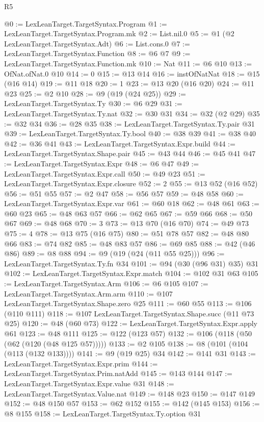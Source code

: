 \begin{lexlean}{R5}
\begin{coremodule}
@0 := LexLeanTarget.TargetSyntax.Program
@1 := LexLeanTarget.TargetSyntax.Program.mk
@2 := List.nil.{0}
@5 := @1 (@2 LexLeanTarget.TargetSyntax.Adt)
@6 := List.cons.{0}
@7 := LexLeanTarget.TargetSyntax.Function
@8 := @6 @7
@9 := LexLeanTarget.TargetSyntax.Function.mk
@10 := Nat
@11 := @6 @10
@13 := OfNat.ofNat.{0} @10
@14 := 0
@15 := @13 @14
@16 := instOfNatNat
@18 := @15 (@16 @14)
@19 := @11 @18
@20 := 1
@23 := @13 @20 (@16 @20)
@24 := @11 @23
@25 := @2 @10
@28 := @9 (@19 (@24 @25))
@29 := LexLeanTarget.TargetSyntax.Ty
@30 := @6 @29
@31 := LexLeanTarget.TargetSyntax.Ty.nat
@32 := @30 @31
@34 := @32 (@2 @29)
@35 := @32 @34
@36 := @28 @35
@38 := LexLeanTarget.TargetSyntax.Ty.pair @31
@39 := LexLeanTarget.TargetSyntax.Ty.bool
@40 := @38 @39
@41 := @38 @40
@42 := @36 @41
@43 := LexLeanTarget.TargetSyntax.Expr.build
@44 := LexLeanTarget.TargetSyntax.Shape.pair
@45 := @43 @44
@46 := @45 @41
@47 := LexLeanTarget.TargetSyntax.Expr
@48 := @6 @47
@49 := LexLeanTarget.TargetSyntax.Expr.call
@50 := @49 @23
@51 := LexLeanTarget.TargetSyntax.Expr.closure
@52 := 2
@55 := @13 @52 (@16 @52)
@56 := @51 @55
@57 := @2 @47
@58 := @56 @57
@59 := @48 @58
@60 := LexLeanTarget.TargetSyntax.Expr.var
@61 := @60 @18
@62 := @48 @61
@63 := @60 @23
@65 := @48 @63 @57
@66 := @62 @65
@67 := @59 @66
@68 := @50 @67
@69 := @48 @68
@70 := 3
@73 := @13 @70 (@16 @70)
@74 := @49 @73
@75 := 4
@78 := @13 @75 (@16 @75)
@80 := @51 @78 @57
@82 := @48 @80 @66
@83 := @74 @82
@85 := @48 @83 @57
@86 := @69 @85
@88 := @42 (@46 @86)
@89 := @8 @88
@94 := @9 (@19 (@24 (@11 @55 @25)))
@96 := LexLeanTarget.TargetSyntax.Ty.fn @34
@101 := @94 (@30 (@96 @31) @35) @31
@102 := LexLeanTarget.TargetSyntax.Expr.match
@104 := @102 @31 @63
@105 := LexLeanTarget.TargetSyntax.Arm
@106 := @6 @105
@107 := LexLeanTarget.TargetSyntax.Arm.arm
@110 := @107 LexLeanTarget.TargetSyntax.Shape.zero @25
@111 := @60 @55
@113 := @106 (@110 @111)
@118 := @107 LexLeanTarget.TargetSyntax.Shape.succ (@11 @73 @25)
@120 := @48 (@60 @73)
@122 := LexLeanTarget.TargetSyntax.Expr.apply @61
@123 := @48 @111
@125 := @122 (@123 @57)
@132 := @106 (@118 (@50 (@62 (@120 (@48 @125 @57)))))
@133 := @2 @105
@138 := @8 (@101 (@104 (@113 (@132 @133))))
@141 := @9 (@19 @25) @34
@142 := @141 @31
@143 := LexLeanTarget.TargetSyntax.Expr.prim
@144 := LexLeanTarget.TargetSyntax.Prim.natAdd
@145 := @143 @144
@147 := LexLeanTarget.TargetSyntax.Expr.value @31
@148 := LexLeanTarget.TargetSyntax.Value.nat
@149 := @148 @23
@150 := @147 @149
@152 := @48 @150 @57
@153 := @62 @152
@155 := @142 (@145 @153)
@156 := @8 @155
@158 := LexLeanTarget.TargetSyntax.Ty.option @31

\end{coremodule}
\end{lexlean}

